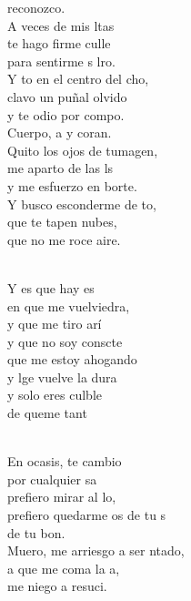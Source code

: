 \documentclass[12pt]{article}
\begin{document}
\begin{multicols*}{2}
\begin{cancion}[Culpable][Ixcís]%
	reconozco. \\
	A veces de mis ltas \\
	te hago firme culle \\
	para sentirme s lro. \\
	Y to en el centro del cho,\\
	clavo un puñal olvido \\
	y te odio por compo. \\
	Cuerpo, a y coran. \\
	Quito los ojos de tumagen, \\
	me aparto de las ls \\
	y me esfuerzo en borte. \\
	Y busco esconderme de to,  \\
	que te tapen  nubes,  \\
	que no me roce aire. \\\jump\\
	\begin{chorus}%
	Y es que hay es \\
	en que me vuelviedra, \\
	y que me tiro arí\\
	y que no soy conscte \\
que me estoy ahogando \\
	y lge vuelve la dura \\
	y solo eres culble \\
	de queme tant\\
	\end{chorus}%
	\jump\\
	En ocasis, te cambio\\
	por cualquier sa\\
	prefiero mirar al lo, \\
	prefiero quedarme os de tu s \\
	de tu bon. \\
	Muero, me arriesgo a ser ntado, \\
	a que me coma la a, \\
	me niego a resuci.  \\
\end{cancion}%


\end{multicols*}
\end{document}
